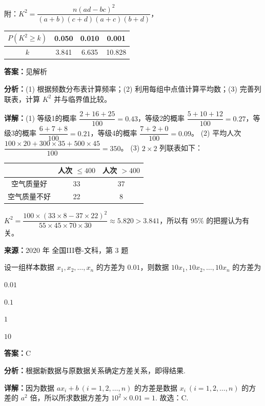 \begin{question}[points=12]
\begin{center}
\begin{tabular}{|c|c|c|}
\end{tabular}

\end{center}

附：$K^2=\dfrac{n(ad-bc)^2}{(a+b)(c+d)(a+c)(b+d)}$，

\begin{center}

\begin{tabular}{c|ccc}

$P(K^2\ge k)$ & 0.050 & 0.010 & 0.001 \\ \hline

$k$ & 3.841 & 6.635 & 10.828 \\

\end{tabular}

\end{center}
\begin{solution}
\textbf{答案：}见解析

\textbf{分析：}(1) 根据频数分布表计算频率；(2) 利用每组中点值计算平均数；(3) 完善列联表，计算 $K^2$ 并与临界值比较。

\textbf{详解：}(1) 等级1的概率 $\dfrac{2+16+25}{100}=0.43$，等级2的概率 $\dfrac{5+10+12}{100}=0.27$，等级3的概率 $\dfrac{6+7+8}{100}=0.21$，等级4的概率 $\dfrac{7+2+0}{100}=0.09$。
(2) 平均人次 $\dfrac{100\times20+300\times35+500\times45}{100}=350$。
(3) $2\times2$ 列联表如下：
\begin{center}
\begin{tabular}{|c|c|c|}
\hline
 & 人次 $\le400$ & 人次 $>400$ \\ \hline
空气质量好 & 33 & 37 \\ \hline
空气质量不好 & 22 & 8 \\ \hline
\end{tabular}
\end{center}
$K^2=\dfrac{100\times(33\times8-37\times22)^2}{55\times45\times70\times30}\approx5.820>3.841$，所以有 $95\%$ 的把握认为有关。
\end{solution}
\end{question}

\begin{question}[points=5]
\textbf{来源：}2020 年 全国III卷-文科，第 3 题\par
设一组样本数据 $x_1,x_2,\dots,x_n$ 的方差为 $0.01$，则数据 $10x_1,10x_2,\dots,10x_n$ 的方差为
\begin{choices}
  \item $0.01$
  \item $0.1$
  \item $1$
  \item $10$
\end{choices}
\begin{solution}
\textbf{答案：}C

\textbf{分析：}根据新数据与原数据关系确定方差关系，即得结果.

\textbf{详解：}因为数据 $ax_i+b\ (i=1,2,\dots,n)$ 的方差是数据 $x_i\ (i=1,2,\dots,n)$ 的方差的 $a^2$ 倍，所以所求数据方差为 $10^2\times0.01=1$. 故选：C.
\end{solution}
\end{question}

